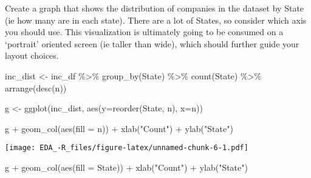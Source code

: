 \documentclass[
]{article}
\newenvironment{Shaded}{\begin{snugshade}}{\end{snugshade}}
\newcommand{\AttributeTok}[1]{\textcolor[rgb]{0.77,0.63,0.00}{#1}}
\newcommand{\FunctionTok}[1]{\textcolor[rgb]{0.00,0.00,0.00}{#1}}
\newcommand{\NormalTok}[1]{#1}
\newcommand{\OtherTok}[1]{\textcolor[rgb]{0.56,0.35,0.01}{#1}}
\newcommand{\SpecialCharTok}[1]{\textcolor[rgb]{0.00,0.00,0.00}{#1}}
\newcommand{\StringTok}[1]{\textcolor[rgb]{0.31,0.60,0.02}{#1}}
\begin{document}
Create a graph that shows the distribution of companies in the dataset
by State (ie how many are in each state). There are a lot of States, so
consider which axis you should use. This visualization is ultimately
going to be consumed on a `portrait' oriented screen (ie taller than
wide), which should further guide your layout choices.

\begin{Shaded}
\begin{Highlighting}[]
\NormalTok{inc\_dist }\OtherTok{\textless{}{-}}\NormalTok{ inc\_df }\SpecialCharTok{\%\textgreater{}\%} 
  \FunctionTok{group\_by}\NormalTok{(State) }\SpecialCharTok{\%\textgreater{}\%} 
  \FunctionTok{count}\NormalTok{(State) }\SpecialCharTok{\%\textgreater{}\%} 
  \FunctionTok{arrange}\NormalTok{(}\FunctionTok{desc}\NormalTok{(n))}
\end{Highlighting}
\end{Shaded}

\begin{Shaded}
\begin{Highlighting}[]
\NormalTok{g }\OtherTok{\textless{}{-}} \FunctionTok{ggplot}\NormalTok{(inc\_dist, }\FunctionTok{aes}\NormalTok{(}\AttributeTok{y=}\FunctionTok{reorder}\NormalTok{(State, n), }\AttributeTok{x=}\NormalTok{n))}
\end{Highlighting}
\end{Shaded}

\begin{Shaded}
\begin{Highlighting}[]
\NormalTok{g }\SpecialCharTok{+} \FunctionTok{geom\_col}\NormalTok{(}\FunctionTok{aes}\NormalTok{(}\AttributeTok{fill =}\NormalTok{ n)) }\SpecialCharTok{+}
  \FunctionTok{xlab}\NormalTok{(}\StringTok{"Count"}\NormalTok{) }\SpecialCharTok{+} 
  \FunctionTok{ylab}\NormalTok{(}\StringTok{"State"}\NormalTok{)}
\end{Highlighting}
\end{Shaded}

\texttt{[image: EDA\_-R\_files/figure-latex/unnamed-chunk-6-1.pdf]}

\begin{Shaded}
\begin{Highlighting}[]
\NormalTok{g }\SpecialCharTok{+} \FunctionTok{geom\_col}\NormalTok{(}\FunctionTok{aes}\NormalTok{(}\AttributeTok{fill =}\NormalTok{ State)) }\SpecialCharTok{+}
  \FunctionTok{xlab}\NormalTok{(}\StringTok{"Count"}\NormalTok{) }\SpecialCharTok{+} 
  \FunctionTok{ylab}\NormalTok{(}\StringTok{"State"}\NormalTok{)}
\end{Highlighting}
\end{Shaded}
\end{document}
